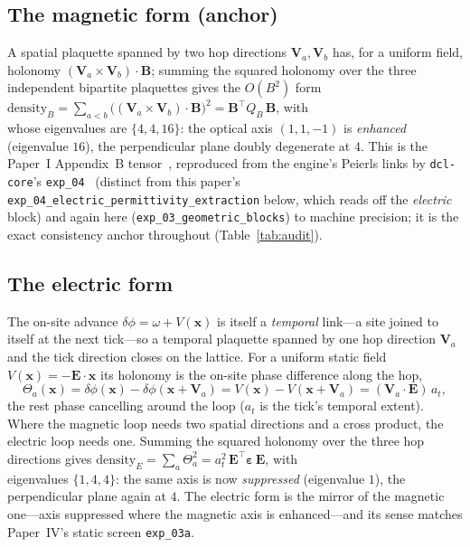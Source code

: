 \subsection{The magnetic form (anchor)}
\label{subsec:magnetic_anchor}

A spatial plaquette spanned by two hop directions $\mathbf{V}_a,\mathbf{V}_b$ has,
for a uniform field, holonomy $(\mathbf{V}_a\!\times\!\mathbf{V}_b)\!\cdot\!\mathbf{B}$;
summing the squared holonomy over the three independent bipartite plaquettes gives
the $O(B^2)$ form
$\text{density}_B = \sum_{a<b}\bigl((\mathbf{V}_a\!\times\!\mathbf{V}_b)\!\cdot\!
\mathbf{B}\bigr)^2 = \mathbf{B}^{\!\top} Q_B\,\mathbf{B}$, with
\begin{equation}
    \label{eq:magnetic_Q}
    
\end{equation}
whose eigenvalues are $\{4,4,16\}$: the optical axis $(1,1,-1)$ is \emph{enhanced}
(eigenvalue $16$), the perpendicular plane doubly degenerate at $4$. This is the
Paper~I Appendix~B tensor~\cite{menendez2026geometryfirst}, reproduced from the
engine's Peierls links by \texttt{dcl-core}'s \texttt{exp\_04}~\cite{dclcore}
(distinct from this paper's \texttt{exp\_04\_electric\_permittivity\_extraction}
below, which reads off the \emph{electric} block) and
again here (\texttt{exp\_03\_geometric\_blocks}) to machine precision; it is the
exact consistency anchor throughout (Table~\ref{tab:audit}).

\subsection{The electric form}
\label{subsec:electric_block}

The on-site advance $\delta\phi = \omega + V(\mathbf{x})$ is itself a \emph{temporal}
link---a site joined to itself at the next tick---so a temporal plaquette spanned by
one hop direction $\mathbf{V}_a$ and the tick direction closes on the lattice. For a
uniform static field $V(\mathbf{x}) = -\mathbf{E}\!\cdot\!\mathbf{x}$ its holonomy is
the on-site phase difference along the hop,
\begin{equation}
    \label{eq:temporal_holonomy}
    \Theta_a(\mathbf{x}) = \delta\phi(\mathbf{x}) - \delta\phi(\mathbf{x}+\mathbf{V}_a)
        = V(\mathbf{x}) - V(\mathbf{x}+\mathbf{V}_a)
        = (\mathbf{V}_a\!\cdot\!\mathbf{E})\,a_t,
\end{equation}
the rest phase cancelling around the loop ($a_t$ is the tick's temporal extent).
Where the magnetic loop needs two spatial directions and a cross product, the
electric loop needs one. Summing the squared holonomy over the three hop directions
gives $\text{density}_E = \sum_a\Theta_a^2 = a_t^2\,\mathbf{E}^{\!\top}
\boldsymbol{\varepsilon}\,\mathbf{E}$, with
\begin{equation}
    \label{eq:electric_P}
    
\end{equation}
eigenvalues $\{1,4,4\}$: the same axis is now \emph{suppressed} (eigenvalue $1$),
the perpendicular plane again at $4$. The electric form is the mirror of the
magnetic one---axis suppressed where the magnetic axis is enhanced---and its sense
matches Paper~IV's static screen \texttt{exp\_03a}.

